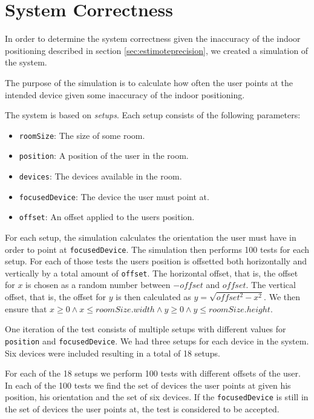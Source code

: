 \section{System Correctness}
\label{sec:evaluation:system-correctness}

In order to determine the system correctness given the inaccuracy of the indoor positioning described in section \ref{sec:estimoteprecision}, we created a simulation of the system.

The purpose of the simulation is to calculate how often the user points at the intended device given some inaccuracy of the indoor positioning.

The system is based on \textit{setups}. Each setup consists of the following parameters:

\begin{itemize}
\item \texttt{roomSize}: The size of some room.
\item \texttt{position}: A position of the user in the room.
\item \texttt{devices}: The devices available in the room.
\item \texttt{focusedDevice}: The device the user must point at.
\item \texttt{offset}: An offset applied to the users position.
\end{itemize}

For each setup, the simulation calculates the orientation the user must have in order to point at \texttt{focusedDevice}. The simulation then performs 100 tests for each setup. For each of those tests the users position is offsetted both horizontally and vertically by a total amount of \texttt{offset}. The horizontal offset, that is, the offset for $x$ is chosen as a random number between $-offset$ and $offset$. The vertical offset, that is, the offset for $y$ is then calculated as $y = \sqrt{offset^2 - x^2}$. We then ensure that $x \geq 0 \wedge x \leq roomSize.width \wedge y \geq 0 \wedge y \leq roomSize.height$.

One iteration of the test consists of multiple setups with different values for \texttt{position} and \texttt{focusedDevice}. We had three setups for each device in the system. Six devices were included resulting in a total of 18 setups.

For each of the 18 setups we perform 100 tests with different offsets of the user. In each of the 100 tests we find the set of devices the user points at given his position, his orientation and the set of six devices. If the \texttt{focusedDevice} is still in the set of devices the user points at, the test is considered to be accepted. 


